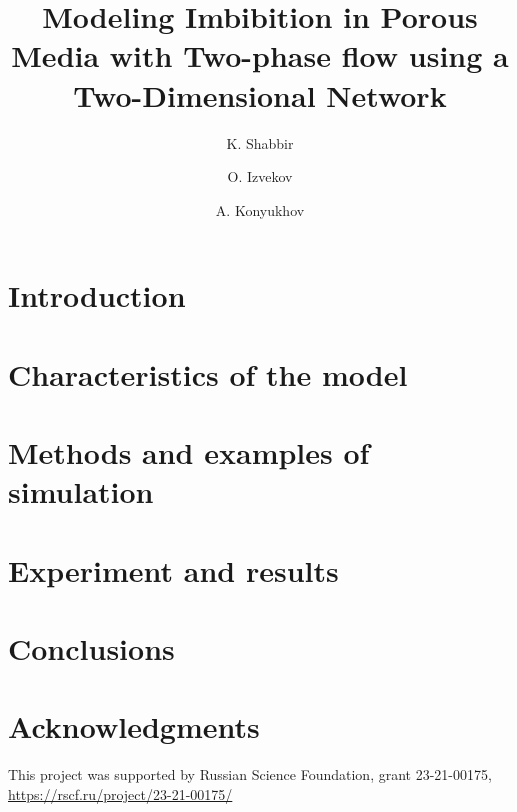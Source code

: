 \documentclass[
	12pt
] {article}
\title{Modeling Imbibition in Porous Media with Two-phase flow using a Two-Dimensional Network}
\author[1]{K. Shabbir}
\author[1]{O. Izvekov}
\author[1]{A. Konyukhov}
\affil[1]{Moscow Institute of Physics and Technology}
\begin{document}
	\nocite{*}
	\maketitle
	
	\begin{abstract}
		
	\end{abstract}
		
	\section{Introduction} \label{sec:intro}
		
		
	\section{Characteristics of the model} \label{sec:model}
		
		
	\section{Methods and examples of simulation} \label{sec:computation}
		

	\section{Experiment and results} \label{sec:experiment}
		

	\section{Conclusions} \label{sec:conclusion}
		
		
	\section{Acknowledgments}
		This project was supported by Russian Science Foundation, grant 23-21-00175, \url{https://rscf.ru/project/23-21-00175/}
		
	
	
		
\end{document}
